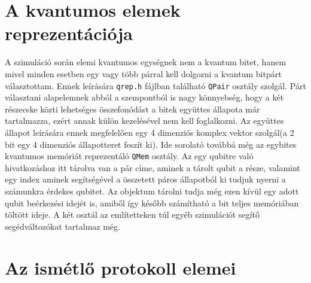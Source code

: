 \section{A kvantumos elemek reprezentációja}

A szimuláció során elemi kvantumos egységnek nem a kvantum bitet, hanem mivel minden esetben egy vagy több párral kell dolgozni a kvantum bitpárt választottam. Ennek leírására \texttt{qrep.h} fájlban található \texttt{QPair} osztály szolgál. Párt választani alapelemnek abból a szempontból is nagy könnyebség, hogy a két részecske közti lehetséges összefonódást a bitek együttes állapota már tartalmazza, ezért annak külön kezelésével nem kell foglalkozni. Az együttes állapot leírására ennek megfelelően egy 4 dimenziós komplex vektor szolgál(a 2 bit egy 4 dimenziós állapotteret feszít ki).  Ide sorolató továbbá még az egybites kvantumos memóriát reprezentáló \texttt{QMem} osztály. Az egy qubitre való hivatkozáshoz itt tárolva van a pár címe, aminek a tárolt qubit a része, valamint egy index aminek segítségével a összetett páros állapotból ki tudjuk nyerni a számunkra érdekes qubitet. Az objektum tárolni tudja még ezen kívül egy adott qubit beérkezési idejét is, amiből így később számítható a bit teljes memóriában töltött ideje. A két osztál az említetteken túl egyéb szimulációt segítő segédváltozókat tartalmaz még.

\section{Az ismétlő protokoll elemei }

